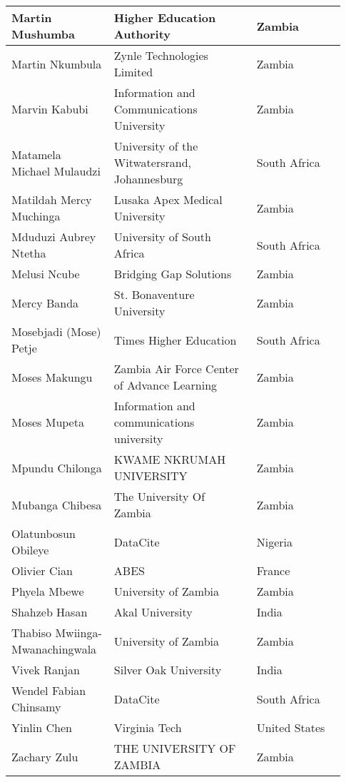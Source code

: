 \begin{center}
\begin{longtable}{p{0.28\linewidth} p{0.4\linewidth} p{0.25\linewidth}}
Martin Mushumba & Higher Education Authority & Zambia \\  \hline
Martin Nkumbula & Zynle Technologies Limited & Zambia \\  \hline
Marvin Kabubi & Information and Communications University & Zambia \\  \hline
Matamela Michael Mulaudzi & University of the Witwatersrand, Johannesburg & South Africa \\  \hline
Matildah Mercy Muchinga & Lusaka Apex Medical University & Zambia \\  \hline
Mduduzi Aubrey Ntetha & University of South Africa & South Africa \\  \hline
Melusi Ncube & Bridging Gap Solutions & Zambia \\  \hline
Mercy Banda & St. Bonaventure University & Zambia \\  \hline
Mosebjadi (Mose) Petje & Times Higher Education & South Africa \\  \hline
Moses Makungu & Zambia Air Force Center of Advance Learning & Zambia \\  \hline
Moses Mupeta & Information and communications university & Zambia \\  \hline
Mpundu Chilonga & KWAME NKRUMAH UNIVERSITY & Zambia \\  \hline
Mubanga Chibesa & The University Of Zambia & Zambia \\  \hline
Olatunbosun Obileye & DataCite & Nigeria \\  \hline
Olivier Cian & ABES & France \\  \hline
Phyela Mbewe & University of Zambia & Zambia \\  \hline
Shahzeb Hasan & Akal University & India \\  \hline
Thabiso Mwiinga-Mwanachingwala & University of Zambia & Zambia \\  \hline
Vivek Ranjan & Silver Oak University & India \\  \hline
Wendel Fabian Chinsamy & DataCite & South Africa \\  \hline
Yinlin Chen & Virginia Tech & United States \\  \hline
Zachary Zulu & THE UNIVERSITY OF ZAMBIA & Zambia \\  \hline
\end{longtable}
\end{center}
